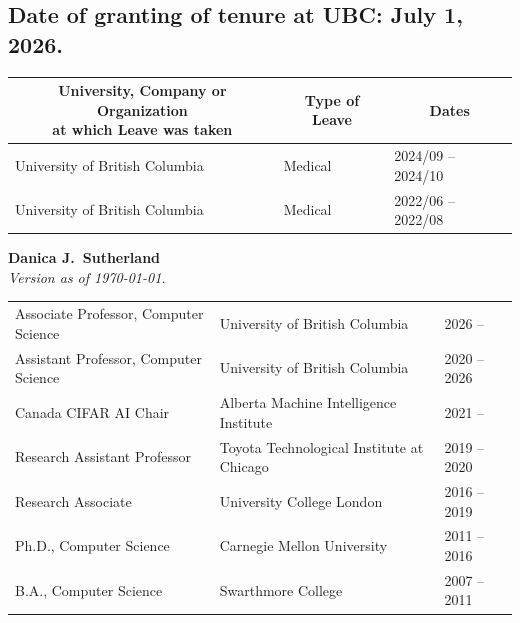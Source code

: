 \documentclass[10pt]{article}
\begin{document}
{\vspace{-1em}
\subsection{Date of granting of tenure at UBC: \textmd{July 1, 2026}.}

{%
  \noindent\vspace{-2em}
  \begin{table}[h!]
    \begin{tabular}{ p{} p{} p{} }
      \toprule
      \multicolumn{1}{c}{\parbox[c][][c]{0.45\textwidth}{\centering\bf University, Company or Organization \\ at which Leave was taken}} &
      \multicolumn{1}{c}{\bf Type of Leave}
      & \multicolumn{1}{c}{\bf Dates} \\
      \midrule
      University of British Columbia &  Medical & 2024/09 -- 2024/10 \\
      University of British Columbia &  Medical & 2022/06 -- 2022/08 \\
      \bottomrule
    \end{tabular}
  \end{table}

  \clearpage
}%

}{
    \begin{center}
    \textbf{\Large Danica J.\ Sutherland}
    \\
    \footnotesize{\textit{Version as of \today.}}
    \end{center}

\begin{table}[h!]
  \begin{tabular}{ p{} p{} p{} }
    \toprule
    Associate Professor, Computer Science & University of British Columbia  & 2026 --         \\
    Assistant Professor, Computer Science & University of British Columbia  & 2020 -- 2026    \\
    Canada CIFAR AI Chair & Alberta Machine Intelligence Institute & 2021 --  \\
    \midrule
    Research Assistant Professor & Toyota Technological Institute at Chicago & 2019 -- 2020 \\
    Research Associate & University College London & 2016 -- 2019 \\
    Ph.D., Computer Science & Carnegie Mellon University & 2011 -- 2016 \\
    B.A., Computer Science & Swarthmore College & 2007 -- 2011 \\
    \bottomrule
  \end{tabular}
\end{table}
}
\end{document}
